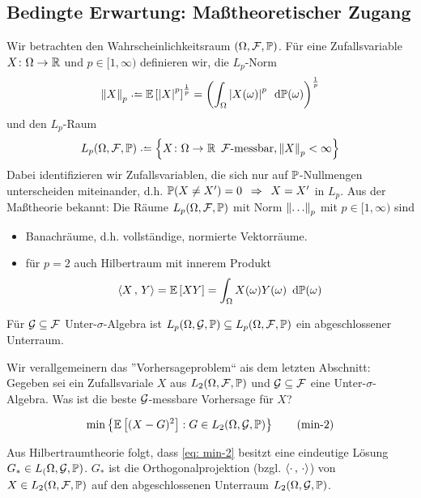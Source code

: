 \subsection{Bedingte Erwartung: Maßtheoretischer Zugang}

Wir betrachten den Wahrscheinlichkeitsraum $(\Omega, \F, \P)$. Für eine Zufallsvariable $\abb{X}{\Omega}{\R}$ und $p \in [1,\infty)$ definieren wir, die $L_p$-Norm
\begin{equation*}
\norm{X}_p \defeq \EW[\abs{X}^p]^{\frac{1}{p}} = \brackets{\int_\Omega \abs{X(\omega)}^p \diffskip{\P(\omega)}}^\frac{1}{p}
\end{equation*}
und den $L_p$-Raum
\begin{equation*}
L_p(\Omega, \F, \P) \defeq \menge{\abb{X}{\Omega}{\R} \enskip \F\text{-messbar}, \norm{X}_p < \infty}
\end{equation*}
Dabei identifizieren wir Zufallsvariablen, die sich nur auf $\P$-Nullmengen unterscheiden miteinander, d.h. $\P(X \neq X') = 0 \follows X = X'$ in $L_p$. Aus der Maßtheorie bekannt: Die Räume $L_p(\Omega,\F,\P)$ mit Norm $\norm{\dots}_p$ mit $p \in [1,\infty)$ sind
\begin{itemize}
	\item Banachräume, d.h. vollständige, normierte Vektorräume.
	\item für $p=2$ auch Hilbertraum mit innerem Produkt 
	\begin{equation*}
	\scal{X}{Y} = \EW[XY] = \int_\Omega X(\omega) Y(\omega) \diffskip{\P(\omega)}
	\end{equation*}
\end{itemize}

Für $\G \subseteq \F$ Unter-$\sigma$-Algebra ist $L_p(\Omega,\G,\P) \subseteq L_p(\Omega, \F, \P)$ ein abgeschlossener Unterraum.

Wir verallgemeinern das ''Vorhersageproblem`` ais dem letzten Abschnitt: Gegeben sei ein Zufallsvariale $X$ aus $L_2(\Omega,\F,\P)$ und $\G \subseteq \F$ eine Unter-$\sigma$-Algebra. Was ist die beste $\G$-messbare Vorhersage für $X$?

\begin{equation}
\min\menge{\EW[(X-G)^2] : G \in L_2(\Omega,\G,\P)} \tag{min-2} \label{eq: min-2}
\end{equation}

Aus Hilbertraumtheorie folgt, dass \eqref{eq: min-2} besitzt eine eindeutige Lösung $G_\ast \in L_(\Omega, \G, \P)$. $G_\ast$ ist die Orthogonalprojektion (bzgl. $\scal{\cdot}{\cdot}$) von $X \in L_2(\Omega,\F,\P)$ auf den abgeschlossenen Unterraum $L_2(\Omega,\G,\P)$.

